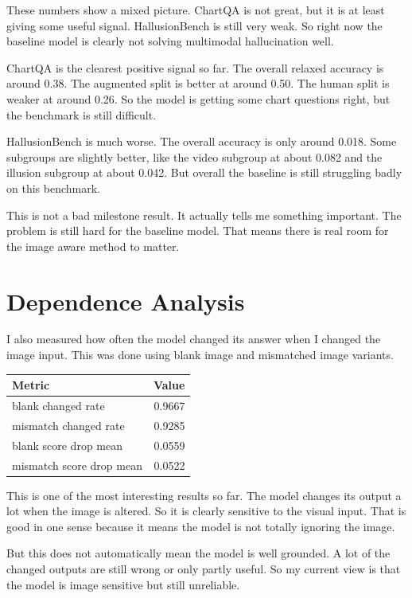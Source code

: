 \documentclass[11pt]{article}
\begin{document}
These numbers show a mixed picture.
ChartQA is not great, but it is at least giving some useful signal.
HallusionBench is still very weak.
So right now the baseline model is clearly not solving multimodal hallucination well.

ChartQA is the clearest positive signal so far.
The overall relaxed accuracy is around 0.38.
The augmented split is better at around 0.50.
The human split is weaker at around 0.26.
So the model is getting some chart questions right, but the benchmark is still difficult.

HallusionBench is much worse.
The overall accuracy is only around 0.018.
Some subgroups are slightly better, like the video subgroup at about 0.082 and the illusion subgroup at about 0.042.
But overall the baseline is still struggling badly on this benchmark.

This is not a bad milestone result.
It actually tells me something important.
The problem is still hard for the baseline model.
That means there is real room for the image aware method to matter.

\section*{Dependence Analysis}
I also measured how often the model changed its answer when I changed the image input.
This was done using blank image and mismatched image variants.

\begin{center}
\begin{tabular}{lr}
\toprule
Metric & Value \\
\midrule
blank changed rate & 0.9667 \\
mismatch changed rate & 0.9285 \\
blank score drop mean & 0.0559 \\
mismatch score drop mean & 0.0522 \\
\bottomrule
\end{tabular}
\end{center}

This is one of the most interesting results so far.
The model changes its output a lot when the image is altered.
So it is clearly sensitive to the visual input.
That is good in one sense because it means the model is not totally ignoring the image.

But this does not automatically mean the model is well grounded.
A lot of the changed outputs are still wrong or only partly useful.
So my current view is that the model is image sensitive but still unreliable.
\end{document}
